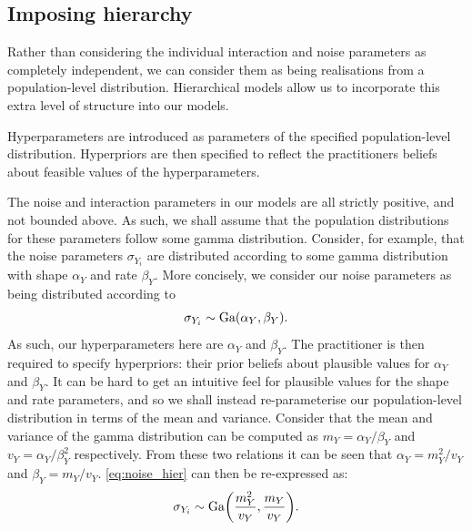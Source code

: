 \subsection{Imposing hierarchy}

Rather than considering the individual interaction and noise parameters as completely
independent, we can consider them as being realisations from a population-level
distribution. Hierarchical models allow us to incorporate this extra level of structure
into our models.

Hyperparameters are introduced as parameters of the specified population-level distribution.
Hyperpriors are then specified to reflect the practitioners beliefs about feasible values
of the hyperparameters.

The noise and interaction parameters in our models are all strictly positive, and not
bounded above. As such, we shall assume that the population distributions for these
parameters follow some gamma distribution. Consider, for example, that the noise
parameters $\sigma_{Y_i}$ are distributed according to some gamma distribution with shape
$\alpha_Y$ and rate $\beta_Y$. More concisely, we consider our noise parameters as being
distributed according to
\begin{equation}
    \label{eq:noise_hier}
    \sigma_{Y_i} \sim \textrm{Ga}(\alpha_Y, \beta_Y).
\end{equation}
As such, our hyperparameters here are $\alpha_Y$ and $\beta_Y$. The practitioner is then
required to specify hyperpriors: their prior beliefs about plausible values for $\alpha_Y$
and $\beta_Y$. It can be hard to get an intuitive feel for plausible values for the shape
and rate parameters, and so we shall instead re-parameterise our population-level
distribution in terms of the mean and variance. Consider that the mean and variance of the
gamma distribution can be computed as $m_Y = \alpha_Y / \beta_Y$ and $v_Y =
\alpha_Y/\beta_Y^2$ respectively. From these two relations it can be seen that $\alpha_Y =
m_Y^2 / v_Y$ and $\beta_Y = m_Y / v_Y$. \cref{eq:noise_hier} can then be re-expressed as:
\begin{equation}
    \sigma_{Y_i} \sim \textrm{Ga}\bigg(\frac{m_Y^2}{v_Y}, \frac{m_Y}{v_Y}\bigg).
\end{equation}












